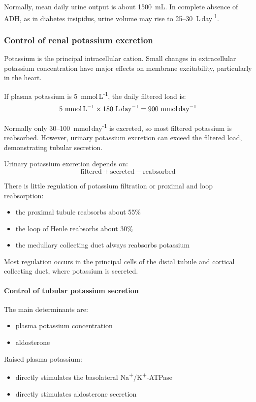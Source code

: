 \documentclass[11pt,a4paper]{article}
\begin{document}
Normally, mean daily urine output is about 1500~mL. In complete absence of ADH, as in diabetes insipidus, urine volume may rise to 25--30~L\,day\textsuperscript{-1}.

\subsubsection{Control of renal potassium excretion}

Potassium is the principal intracellular cation. Small changes in extracellular potassium concentration have major effects on membrane excitability, particularly in the heart.

If plasma potassium is 5~mmol\,L\textsuperscript{-1}, the daily filtered load is:
\[
5~\text{mmol\,L}^{-1} \times 180~\text{L\,day}^{-1} = 900~\text{mmol\,day}^{-1}
\]

Normally only 30--100~mmol\,day\textsuperscript{-1} is excreted, so most filtered potassium is reabsorbed. However, urinary potassium excretion can exceed the filtered load, demonstrating tubular secretion.

Urinary potassium excretion depends on:
\[
\text{filtered} + \text{secreted} - \text{reabsorbed}
\]

There is little regulation of potassium filtration or proximal and loop reabsorption:
\begin{itemize}
    \item the proximal tubule reabsorbs about 55\%
    \item the loop of Henle reabsorbs about 30\%
    \item the medullary collecting duct always reabsorbs potassium
\end{itemize}

Most regulation occurs in the principal cells of the distal tubule and cortical collecting duct, where potassium is secreted.

\paragraph{Control of tubular potassium secretion}

The main determinants are:
\begin{itemize}
    \item plasma potassium concentration
    \item aldosterone
\end{itemize}

Raised plasma potassium:
\begin{itemize}
    \item directly stimulates the basolateral Na\textsuperscript{+}/K\textsuperscript{+}-ATPase
    \item directly stimulates aldosterone secretion
\end{itemize}
\end{document}
